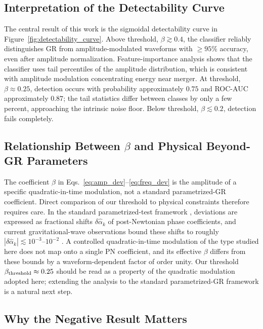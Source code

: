 \subsection{Interpretation of the Detectability Curve}

The central result of this work is the sigmoidal detectability curve
in Figure~\ref{fig:detectability_curve}. Above threshold,
$\beta \gtrsim 0.4$, the classifier reliably distinguishes GR from
amplitude-modulated waveforms with $\geq 95\%$ accuracy, even after
amplitude normalization. Feature-importance analysis shows that the
classifier uses tail percentiles of the amplitude distribution, which
is consistent with amplitude modulation concentrating energy near
merger. At threshold, $\beta \approx 0.25$, detection occurs with
probability approximately $0.75$ and ROC-AUC approximately $0.87$; the
tail statistics differ between classes by only a few percent,
approaching the intrinsic noise floor. Below threshold,
$\beta \lesssim 0.2$, detection fails completely.

\subsection{Relationship Between $\beta$ and Physical Beyond-GR Parameters}

The coefficient $\beta$ in Eqs.~\eqref{eq:amp_dev}--\eqref{eq:freq_dev}
is the amplitude of a specific quadratic-in-time modulation, not a
standard parametrized-GR coefficient. Direct comparison of our
threshold to physical constraints therefore requires care. In the
standard parametrized-test framework \citep{Yunes2019}, deviations are
expressed as fractional shifts $\delta \hat{\alpha}_k$ of post-Newtonian
phase coefficients, and current gravitational-wave observations bound
these shifts to roughly $|\delta \hat{\alpha}_k| \lesssim 10^{-3}$--$10^{-2}$
\citep{Abbott2021tests}. A controlled quadratic-in-time modulation of
the type studied here does not map onto a single PN coefficient, and
its effective $\beta$ differs from these bounds by a
waveform-dependent factor of order unity. Our threshold
$\beta_{\rm threshold} \approx 0.25$ should be read as a property of
the quadratic modulation adopted here; extending the analysis to the
standard parametrized-GR framework is a natural next step.

\subsection{Why the Negative Result Matters}

